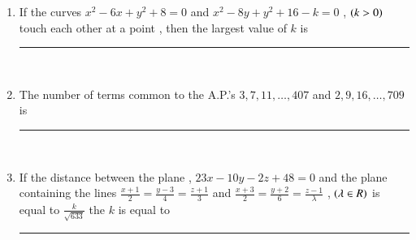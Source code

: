 \documentclass[journal]{IEEEtran}
\begin{document}
\begin{enumerate}
   \item If the curves $x^2-6x+y^2+8=0$ and $x^2-8y+y^2+16-k=0$ , $\left(k>0\right)$ touch each other at a point , then the largest value of $k$ is \rule{1cm}{0.15mm}\\

   \item The number of terms common to the A.P.'s $3,7,11,\dots , 407$ and $2,9,16,\dots , 709$ is \rule{1cm}{0.15mm}\\


   \item If the distance between the plane , $23x-10y-2z+48=0$ and the plane containing the lines $\frac{x+1}{2} = \frac{y-3}{4} = \frac{z+1}{3}$ and $\frac{x+3}{2} = \frac{y+2}{6} = \frac{z-1}{\lambda}$ , $\left(\lambda \in R\right)$ is equal to $\frac{k}{\sqrt{633}}$ the $k$ is equal to \rule{1cm}{0.15mm}\\
\end{enumerate}
\end{document}
